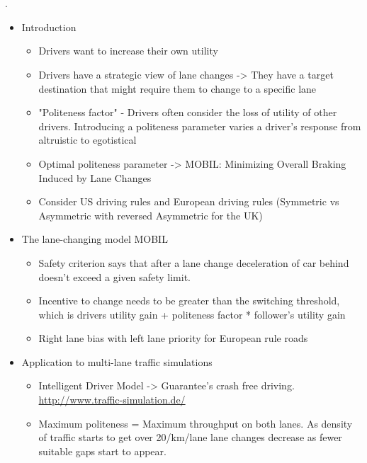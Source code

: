 \section{}
\label{sec:Kesting2007}
.

\begin{itemize}
\item Introduction
\begin{itemize}
\item Drivers want to increase their own utility
\item Drivers have a strategic view of lane changes -> They have a target destination that might require them to change to a specific lane
\item "Politeness factor" - Drivers often consider the loss of utility of other drivers. Introducing a politeness parameter varies a driver's response from altruistic to egotistical
\item Optimal politeness parameter -> MOBIL: Minimizing Overall Braking Induced by Lane Changes
\item Consider US driving rules and European driving rules (Symmetric vs Asymmetric with reversed Asymmetric for the UK)
\end{itemize}
\item The lane-changing model MOBIL
\begin{itemize}
\item Safety criterion says that after a lane change deceleration of car behind doesn't exceed a given safety limit.
\item Incentive to change needs to be greater than the switching threshold, which is drivers utility gain + politeness factor * follower's utility gain
\item Right lane bias with left lane priority for European rule roads
\end{itemize}
\item Application to multi-lane traffic simulations
\begin{itemize}
\item Intelligent Driver Model -> Guarantee's crash free driving. \url{http://www.traffic-simulation.de/}
\item Maximum politeness = Maximum throughput on both lanes. As density of traffic starts to get over 20/km/lane lane changes decrease as fewer suitable gaps start to appear.
\end{itemize}
\end{itemize}